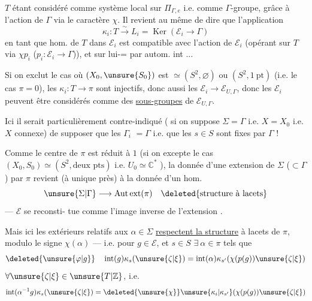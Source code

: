 
$T$ étant considéré comme système local
sur $\Pi_{\Gamma,e}$  i.e. comme $\Gamma$-groupe, grâce à l'action
de $\Gamma$ via le caractère $\chi$. Il revient au
même de dire que  l'application
\[
\kappa_i:T\xrightarrow{\sim}L_i=\operatorname{Ker}(\mathcal E_i\longrightarrow\Gamma)
\]
en tant que hom. de $T$ dans $\mathcal E_i$ est
compatible avec l'action de $\mathcal E_i$ (opérant
sur $T$ via $\chi p_i$ ($p_i:\mathcal E_i\longrightarrow\Gamma$)),  et sur
lui-= par autom. int ...

Si on exclut le cas où $(X_0,\unsure{S_0})$
est $\simeq(S^2,\varnothing)$ ou $(S^2,1\ \mathrm{pt})$ (i.e.
le cas $\pi=0$), les $\kappa_i:T\longrightarrow\pi$ sont injectifs,
donc aussi les $\mathcal E_i\longrightarrow\mathcal E_{U,\Gamma}$, donc les
$\mathcal E_i$ peuvent être considérés comme des
\uline{sous-groupes} de $\mathcal E_{U,\Gamma}$.

\unsure{\S} Ici il  serait particulièrement
contre-indiqué ( si on suppose $\Sigma=\Gamma$ i.e.
$X=X_0$ i.e. $X$ connexe) de supposer que
les $\Gamma_i$  $=\Gamma$ i.e. que les $s\in S$ sont fixes
par $\Gamma$ !


Comme le centre de $\pi$ est réduit à $1$
(si on excepte  le cas $(X_0,S_0)\simeq(S^2,\text{deux pts})$
i.e. $U_0\simeq\mathbb C^*$ ), la donnée d'une extension
de $\Sigma$ ($\subset\Gamma$) par $\pi$ revient (à  unique
près) à la donnée d'un hom.
\[
\unsure{\Sigma|\Gamma}\longrightarrow\mathrm{Aut\,ext}(\pi)\quad\deleted{\text{structure à lacets}}
\]
 --- $\mathcal E$ se reconsti-
tue comme l'image inverse de l'extension
.

Mais ici les  extérieurs relatifs
aux $\alpha\in\Sigma$  \uline{respectent la structure}
à lacets  de $\pi$, modulo le
signe $\chi(\alpha)$ --- i.e. pour $g\in\mathcal E$, et $s\in S$
$\exists\ \alpha\in\pi$  tels que
\[
\deleted{\unsure{\varphi|g}}\quad
\operatorname{int}(g)\kappa_s(\unsure{\zeta|\xi})
=\operatorname{int}(\alpha)\kappa_{s'}(\chi(p(g))\unsure{\zeta|\xi})
\]
$\forall\unsure{\zeta|\xi}\in\unsure{T|\mathbb Z}$, i.e.
\[
\operatorname{int}(\alpha^{-1}g)\kappa_s(\unsure{\zeta|\xi})
=\deleted{\unsure{\chi}}\unsure{\kappa_i|\kappa_{s'}}(\chi(p(g))\unsure{\zeta|\xi})
\]

